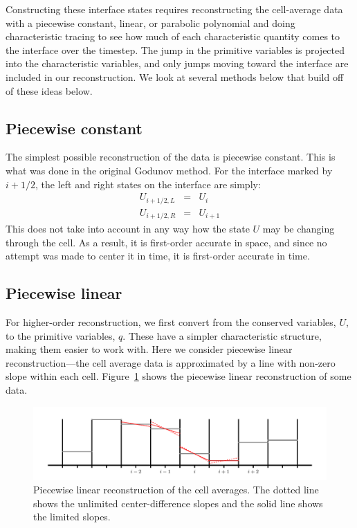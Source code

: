 Constructing these interface states requires reconstructing the
cell-average data with a piecewise constant, linear, or parabolic
polynomial and doing characteristic tracing to see how much of each
characteristic quantity comes to the interface over the timestep.  The
jump in the primitive variables is projected into the characteristic
variables, and only jumps moving toward the interface are included in
our reconstruction.  We look at several methods below that build off
of these ideas below.

\subsection{Piecewise constant}

The simplest possible reconstruction of the data is piecewise constant.
This is what was done in the original Godunov method.  For the interface
marked by $i+1/2$, the left and right states on the interface are simply:
\begin{eqnarray}
U_{i+1/2,L} &=& U_i \\
U_{i+1/2,R} &=& U_{i+1}
\end{eqnarray}
This does not take into account in any way how the state $U$ may be changing
through the cell.  As a result, it is first-order accurate in space, and since
no attempt was made to center it in time, it is first-order accurate in time.

\subsection{Piecewise linear}

For higher-order reconstruction, we first convert from the conserved
variables, $U$, to the primitive variables, $q$.  These have a simpler
characteristic structure, making them easier to work with.  Here we
consider piecewise linear reconstruction---the cell average data is
approximated by a line with non-zero slope within each cell.
Figure~\ref{fig:plm} shows the piecewise linear reconstruction of some
data.

\begin{figure}[t]
\centering
\includegraphics[width=\linewidth]{piecewise-linear}
\caption[Piecewise linear reconstruction of cell average
  data.]{\label{fig:plm} Piecewise linear reconstruction of the cell
  averages.  The dotted line shows the unlimited center-difference
  slopes and the solid line shows the limited slopes.}
\end{figure}

